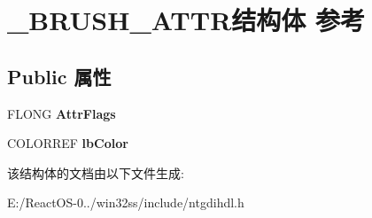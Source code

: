 \hypertarget{struct___b_r_u_s_h___a_t_t_r}{}\section{\+\_\+\+B\+R\+U\+S\+H\+\_\+\+A\+T\+T\+R结构体 参考}
\label{struct___b_r_u_s_h___a_t_t_r}
\subsection*{Public 属性}
\begin{DoxyCompactItemize}
\item 
\mbox{\label{struct___b_r_u_s_h___a_t_t_r_a84f2ef27dd95e60f6685c38c3b1e6c3c}} 
F\+L\+O\+NG {\bfseries Attr\+Flags}
\item 
\mbox{\label{struct___b_r_u_s_h___a_t_t_r_a5d69c0c874c494ef2e5cc8840068b6d1}} 
C\+O\+L\+O\+R\+R\+EF {\bfseries lb\+Color}
\end{DoxyCompactItemize}


该结构体的文档由以下文件生成\+:\begin{DoxyCompactItemize}
\item 
E\+:/\+React\+O\+S-\/0../win32ss/include/ntgdihdl.\+h\end{DoxyCompactItemize}
